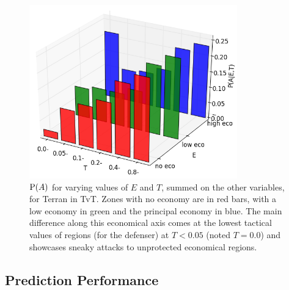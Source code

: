 \begin{figure}[!h]
\centerline{\includegraphics[width=9cm]{images/where3D_EI_TI_RegT.png}}
\caption{$\mathrm{P}(A)$ for varying values of $E$ and $T$, summed on the other variables, for Terran in TvT. Zones with no economy are in red bars, with a low economy in green and the principal economy in blue. The main difference along this economical axis comes at the lowest tactical values of regions (for the defenser) at $T<0.05$ (noted $T=0.0$) and showcases sneaky attacks to unprotected economical regions.}
\label{fig:Where3D}
\end{figure}

\subsection{Prediction Performance}
